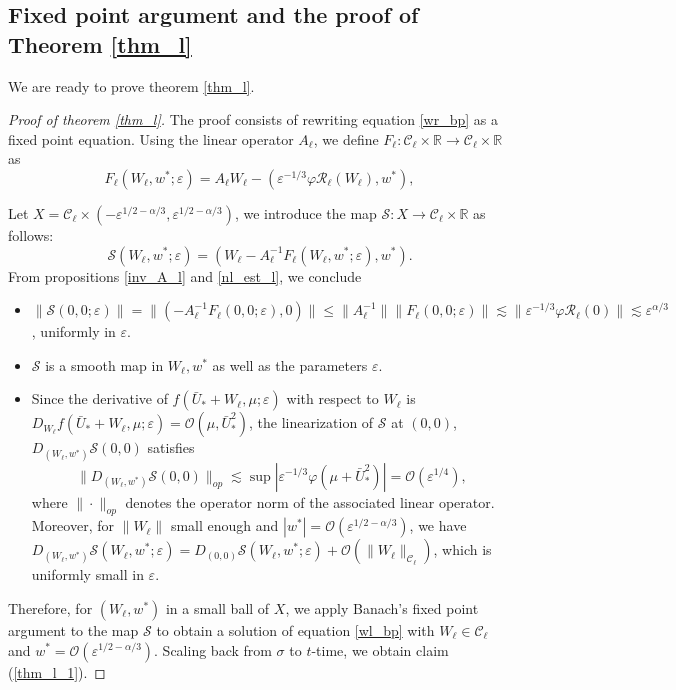 \documentclass[letterpaper,11pt]{article}
\newcommand{\Ral}{\mathcal{R}}
\newcommand{\rmO}{\mathcal{O}}
\newcommand{\eps}{\varepsilon}
\newcommand{\lar}{ \lesssim }
\numberwithin{equation}{section}
\theoremstyle{plain}
\begin{document}
\subsection{Fixed point argument and the proof of Theorem \ref{thm_l}}
We are ready to prove theorem \ref{thm_l}.
\begin{proof}[Proof of theorem \ref{thm_l}]
The proof consists of rewriting equation \eqref{wr_bp} as a fixed point equation. Using the linear operator $A_\ell$, we define
$F_\ell : \mathcal{C}_\ell \times \mathbb{R} \to \mathcal{C}_\ell \times \mathbb{R}$ as
\[
F_\ell(W_\ell, w^*; \eps) = A_\ell W_\ell - (\eps^{-1/3}\varphi \Ral_\ell(W_\ell), w^*),
\]

Let $X = \mathcal{C}_\ell \times (-\eps^{1/2-\alpha/3},\eps^{1/2-\alpha/3})$, we introduce the map $\mathcal{S}: X \to \mathcal{C}_\ell\times \mathbb{R}$ as follows:
\[
\mathcal{S}(W_\ell,w^*; \eps) = (W_\ell-A_\ell^{-1}F_\ell(W_\ell,w^*;\eps), w^*).
\]
From propositions \ref{inv_A_l} and \ref{nl_est_l}, we conclude 
\begin{itemize}
\item $\|\mathcal{S}(0,0;\eps) \|= \|\left( -A_\ell^{-1}F_\ell(0,0;\eps),0\right)\| \le \|A_\ell^{-1}\|\|F_\ell(0,0;\eps)\| \lar \|\eps^{-1/3}\varphi \Ral_\ell(0)\| \lar \eps^{\alpha/3}$, uniformly in $\eps$.

\item $\mathcal{S}$ is a smooth map in $W_\ell,w^*$ as well as the parameters $\eps$.

\item Since the derivative of $f(\bar{U}_*+W_\ell,\mu;\eps)$ with respect to $W_\ell$ is $D_{W_\ell} f(\bar{U}_*+W_\ell,\mu;\eps)=\rmO(\mu, \bar{U}_*^2)$, the linearization of $\mathcal{S}$ at $(0,0)$, $D_{(W_\ell,w^*)} \mathcal{S}(0,0)$ satisfies
\[
\|D_{(W_\ell,w^*)} \mathcal{S}(0,0)\|_{op} \lar \sup|\eps^{-1/3}\varphi(\mu+\bar{U}_*^2)| = \rmO(\eps^{1/4}),
\]
where $\|\cdot\|_{op}$ denotes the operator norm of the associated linear operator.
Moreover, for $\|W_{\ell}\|$ small enough and $|w^*| =\rmO(\eps^{1/2-\alpha/3})$, we have $D_{(W_\ell,w^*)}\mathcal{S}(W_\ell,w^*;\eps) =  D_{(0, 0)}\mathcal{S}(W_\ell,w^*;\eps)+\rmO(\|W_\ell\|_{\mathcal{C}_\ell})$, which is uniformly small in $\eps$.
\end{itemize}

Therefore, for $(W_\ell, w^*)$ in a small ball of $X$, we apply Banach's fixed point argument to the map $\mathcal{S}$ to obtain a solution of equation \eqref{wl_bp} with $W_\ell \in \mathcal{C}_\ell$ and $w^* = \rmO(\eps^{1/2-\alpha/3})$. Scaling back from $\sigma$ to $t$-time, we obtain claim (\ref{thm_l_1}).
\end{proof}
\end{document}
